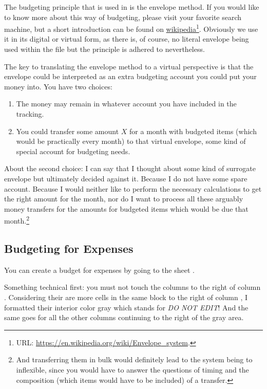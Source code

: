 The budgeting principle that is used in \tfn is the envelope method.
If you would like to know more about this way of budgeting, please visit your favorite search machine, but a short introduction can be found on \href{https://en.wikipedia.org/wiki/Envelope_system}{wikipedia}\footnote{URL: \href{https://en.wikipedia.org/wiki/Envelope_system}{https://en.wikipedia.org/wiki/Envelope{\_}system}.}.
Obviously we use it in its digital or virtual form, as there is, of course, no literal envelope being used within the file but the principle is adhered to nevertheless.

The key to translating the envelope method to a virtual perspective is that the envelope could be interpreted as an extra budgeting account you could put your money into.
You have two choices:
\begin{enumerate}
	\item The money may remain in whatever account you have included in the tracking.
	\item You could transfer some amount \( X \) for a month with budgeted items (which would be practically every month) to that virtual envelope, \ie some kind of special account for budgeting needs.
\end{enumerate}

About the second choice: I can say that I thought about some kind of surrogate envelope but ultimately decided against it.
Because I do not have some spare account.
Because I would neither like to perform the necessary calculations to get the right amount for the month, nor do I want to process all these arguably money transfers for the amounts for budgeted items which would be due that month.\footnote{And transferring them in bulk would definitely lead to the system being to inflexible, since you would have to answer the questions of timing and the composition (which items would have to be included) of a transfer.}

\subsection{Budgeting for Expenses}
\label{subsec:budgeting-expenses}

You can create a budget for expenses by going to the sheet .

Something technical first:
you must not touch the columns to the right of column .
Considering their are more cells in the same block to the right of column , I formatted their interior color gray which stands for \emph{DO NOT EDIT}!
And the same goes for all the other columns continuing to the right of the gray area.

